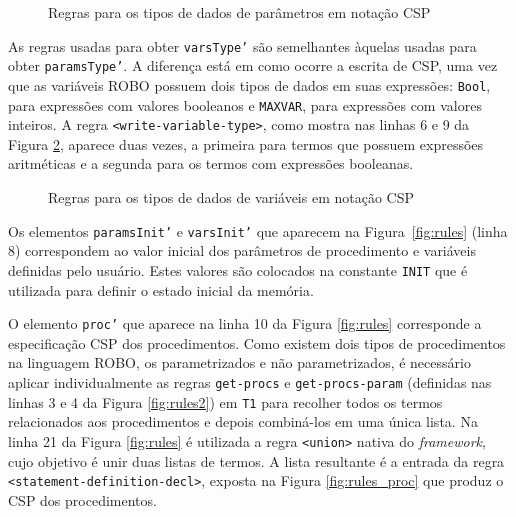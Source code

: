 \begin{figure}[!h]
\centering
\caption{Regras para os tipos de dados de parâmetros em notação CSP}

\label{fig:rules_param_type}
\end{figure}

As regras usadas para obter \texttt{varsType'} são semelhantes àquelas usadas para obter \texttt{paramsType'}. A diferença está em como ocorre a escrita de CSP, uma vez que as variáveis ROBO possuem dois tipos de dados em suas expressões: \texttt{Bool}, para expressões com valores booleanos e \texttt{MAXVAR}, para expressões com valores inteiros. A regra \texttt{<write-variable-type>}, como mostra nas linhas 6 e 9 da Figura \ref{fig:rules_var_type}, aparece duas vezes, a primeira para termos que possuem expressões aritméticas e a segunda para os termos com expressões booleanas.

\begin{figure}[!h]
\centering
\caption{Regras para os tipos de dados de variáveis em notação CSP}

\label{fig:rules_var_type}
\end{figure}


Os elementos \texttt{paramsInit'} e \texttt{varsInit'} que aparecem na Figura~\ref{fig:rules} (linha 8) correspondem ao valor inicial dos parâmetros de procedimento e variáveis definidas pelo usuário. Estes valores são colocados na constante \texttt{INIT} que é utilizada para definir o estado inicial da memória. 

O elemento \texttt{proc'} que aparece na linha 10 da Figura \ref{fig:rules} corresponde a especificação CSP dos procedimentos.  
Como existem dois tipos de procedimentos na linguagem ROBO, os parametrizados e não parametrizados, é necessário aplicar individualmente as regras \texttt{get-procs} e \texttt{get-procs-param} (definidas nas linhas 3 e 4 da Figura \ref{fig:rules2}) em \texttt{T1} para recolher todos os termos relacionados aos procedimentos e depois combiná-los em uma única lista.
Na linha 21 da Figura \ref{fig:rules} é utilizada a regra \texttt{<union>}  nativa do \textit{framework}, cujo objetivo é unir duas listas de termos.  A lista resultante é a entrada da regra \texttt{<statement-definition-decl>}, exposta na Figura \ref{fig:rules_proc} que produz o CSP dos procedimentos.

